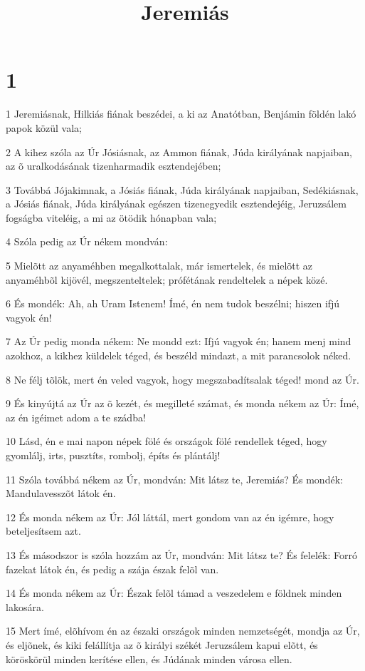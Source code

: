 

\title{Jeremiás}


\chapter{1}

\par 1 Jeremiásnak, Hilkiás fiának beszédei, a ki az Anatótban, Benjámin földén lakó papok közül vala;
\par 2 A kihez szóla az Úr Jósiásnak, az Ammon fiának, Júda királyának napjaiban, az õ uralkodásának tizenharmadik esztendejében;
\par 3 Továbbá Jójakimnak, a Jósiás fiának, Júda királyának  napjaiban, Sedékiásnak, a Jósiás fiának, Júda királyának egészen tizenegyedik esztendejéig, Jeruzsálem fogságba viteléig, a mi az ötödik hónapban vala;
\par 4 Szóla pedig az Úr nékem mondván:
\par 5 Mielõtt az anyaméhben megalkottalak, már ismertelek, és mielõtt az anyaméhbõl kijövél, megszenteltelek; prófétának rendeltelek a népek közé.
\par 6 És mondék: Ah, ah Uram Istenem! Ímé, én nem tudok beszélni; hiszen ifjú vagyok én!
\par 7 Az Úr pedig monda nékem: Ne mondd ezt: Ifjú vagyok én; hanem menj mind azokhoz, a kikhez küldelek téged, és beszéld mindazt, a mit parancsolok néked.
\par 8 Ne félj tõlök, mert én veled vagyok, hogy megszabadítsalak téged! mond az Úr.
\par 9 És kinyújtá az Úr az õ kezét, és megilleté számat, és monda nékem az Úr: Ímé, az én igéimet adom a te szádba!
\par 10 Lásd, én e mai napon népek fölé és országok fölé rendellek téged, hogy gyomlálj, irts, pusztíts, rombolj, építs és plántálj!
\par 11 Szóla továbbá nékem az Úr, mondván: Mit látsz te, Jeremiás? És mondék: Mandulavesszõt látok én.
\par 12 És monda nékem az Úr: Jól láttál, mert gondom van az én igémre, hogy beteljesítsem azt.
\par 13 És másodszor is szóla hozzám az Úr, mondván: Mit látsz te? És felelék: Forró fazekat látok én, és pedig a szája észak felõl van.
\par 14 És monda nékem az Úr: Észak felõl támad a veszedelem e földnek minden lakosára.
\par 15 Mert ímé, elõhívom én az északi országok minden nemzetségét, mondja az Úr, és eljõnek, és kiki felállítja az õ királyi székét Jeruzsálem kapui elõtt, és köröskörül minden kerítése ellen, és Júdának minden városa ellen.
